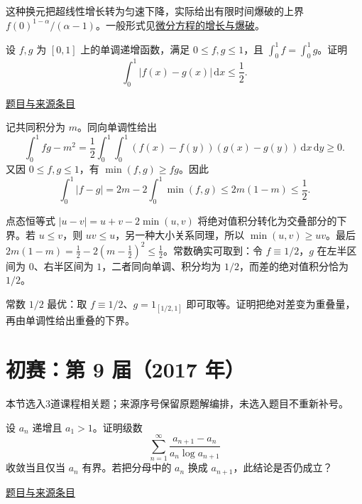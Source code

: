 \documentclass[UTF8,12pt,a4paper,fontset=fandol]{ctexart}
\begin{document}
\begin{remark}[方法与条件]这种换元把超线性增长转为匀速下降，实际给出有限时间爆破的上界 $f(0)^{1-\alpha}/(\alpha-1)$。一般形式见\hyperref[app:dynamics-blowup]{微分方程的增长与爆破}。\end{remark}

\begin{example}[来源序号6]\label{ex:pre08-math:6}\label{pr:pre08-math:6}

设 $f,g$ 为 $[0,1]$ 上的单调递增函数，满足 $0\le f,g\le1$，且 $\int_0^1f=\int_0^1g$。证明
\[
\int_0^1|f(x)-g(x)|\,\mathrm dx\le\frac12.
\]

\par\href{https://github.com/lzxcr/cmc-mathematics/blob/64916fa1fdbc3e444a652eca204d5669058ee321/src/problems/preliminary/08/06.md}{题目与来源条目}

\end{example}

\begin{solve}\label{ans:pre08-math:6}

记共同积分为 $m$。同向单调性给出
\[
\int_0^1fg-m^2
=\frac12\int_0^1\!\int_0^1(f(x)-f(y))(g(x)-g(y))\,\mathrm dx\,\mathrm dy\ge0.
\]
又因 $0\le f,g\le1$，有 $\min(f,g)\ge fg$。因此
\[
\int_0^1|f-g|=2m-2\int_0^1\min(f,g)
\le2m(1-m)\le\frac12.
\]

点态恒等式 $|u-v|=u+v-2\min(u,v)$ 将绝对值积分转化为交叠部分的下界。若 $u\le v$，则 $uv\le u$，另一种大小关系同理，所以 $\min(u,v)\ge uv$。最后 $2m(1-m)=\tfrac12-2(m-\tfrac12)^2\le\tfrac12$。常数确实可取到：令 $f\equiv1/2$，$g$ 在左半区间为 $0$、右半区间为 $1$，二者同向单调、积分均为 $1/2$，而差的绝对值积分恰为 $1/2$。

\end{solve}

\begin{remark}[方法与条件]常数 $1/2$ 最优：取 $f\equiv1/2$、$g=1_{[1/2,1]}$ 即可取等。证明把绝对差变为重叠量，再由单调性给出重叠的下界。\end{remark}

\section{初赛：第 9 届（2017 年）}

本节选入3道课程相关题；来源序号保留原题解编排，未选入题目不重新补号。

\begin{example}[来源序号2]\label{ex:pre09-math:2}\label{pr:pre09-math:2}

设 $a_n$ 递增且 $a_1>1$。证明级数
\[
\sum_{n=1}^\infty\frac{a_{n+1}-a_n}{a_n\log a_{n+1}}
\]
收敛当且仅当 $a_n$ 有界。若把分母中的 $a_n$ 换成 $a_{n+1}$，此结论是否仍成立？

\par\href{https://github.com/lzxcr/cmc-mathematics/blob/64916fa1fdbc3e444a652eca204d5669058ee321/src/problems/preliminary/09/02.md}{题目与来源条目}

\end{example}
\end{document}
